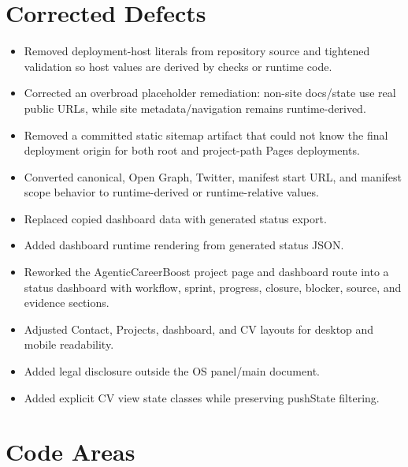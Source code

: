 \documentclass[a4paper,11pt,openany]{report}
\begin{document}
\chapter{Corrected Defects}

\begin{itemize}
  \item Removed deployment-host literals from repository source and tightened
    validation so host values are derived by checks or runtime code.
  \item Corrected an overbroad placeholder remediation: non-site docs/state use
    real public URLs, while site metadata/navigation remains runtime-derived.
  \item Removed a committed static sitemap artifact that could not know the
    final deployment origin for both root and project-path Pages deployments.
  \item Converted canonical, Open Graph, Twitter, manifest start URL, and
    manifest scope behavior to runtime-derived or runtime-relative values.
  \item Replaced copied dashboard data with generated status export.
  \item Added dashboard runtime rendering from generated status JSON.
  \item Reworked the AgenticCareerBoost project page and dashboard route into a
    status dashboard with workflow, sprint, progress, closure, blocker, source,
    and evidence sections.
  \item Adjusted Contact, Projects, dashboard, and CV layouts for desktop and
    mobile readability.
  \item Added legal disclosure outside the OS panel/main document.
  \item Added explicit CV view state classes while preserving pushState
    filtering.
\end{itemize}

\chapter{Code Areas}
\end{document}
